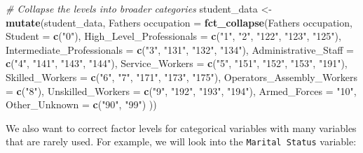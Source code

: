 \documentclass[
]{article}
\newenvironment{Shaded}{\begin{snugshade}}{\end{snugshade}}
\newcommand{\AttributeTok}[1]{\textcolor[rgb]{0.13,0.29,0.53}{#1}}
\newcommand{\CommentTok}[1]{\textcolor[rgb]{0.56,0.35,0.01}{\textit{#1}}}
\newcommand{\FunctionTok}[1]{\textcolor[rgb]{0.13,0.29,0.53}{\textbf{#1}}}
\newcommand{\NormalTok}[1]{#1}
\newcommand{\OtherTok}[1]{\textcolor[rgb]{0.56,0.35,0.01}{#1}}
\newcommand{\SpecialCharTok}[1]{\textcolor[rgb]{0.81,0.36,0.00}{\textbf{#1}}}
\newcommand{\StringTok}[1]{\textcolor[rgb]{0.31,0.60,0.02}{#1}}
\begin{document}
\begin{Shaded}
\begin{Highlighting}[]
\CommentTok{\# Collapse the levels into broader categories}
\NormalTok{student\_data }\OtherTok{\textless{}{-}} \FunctionTok{mutate}\NormalTok{(student\_data, }\StringTok{\textasciigrave{}}\AttributeTok{Father\textquotesingle{}s occupation}\StringTok{\textasciigrave{}} \OtherTok{=} \FunctionTok{fct\_collapse}\NormalTok{(}\StringTok{\textasciigrave{}}\AttributeTok{Father\textquotesingle{}s occupation}\StringTok{\textasciigrave{}}\NormalTok{,}
    \AttributeTok{Student =} \FunctionTok{c}\NormalTok{(}\StringTok{"0"}\NormalTok{),}
    \AttributeTok{High\_Level\_Professionals =} \FunctionTok{c}\NormalTok{(}\StringTok{"1"}\NormalTok{, }\StringTok{"2"}\NormalTok{, }\StringTok{"122"}\NormalTok{, }\StringTok{"123"}\NormalTok{, }\StringTok{"125"}\NormalTok{),}
    \AttributeTok{Intermediate\_Professionals =} \FunctionTok{c}\NormalTok{(}\StringTok{"3"}\NormalTok{, }\StringTok{"131"}\NormalTok{, }\StringTok{"132"}\NormalTok{, }\StringTok{"134"}\NormalTok{),}
    \AttributeTok{Administrative\_Staff =} \FunctionTok{c}\NormalTok{(}\StringTok{"4"}\NormalTok{, }\StringTok{"141"}\NormalTok{, }\StringTok{"143"}\NormalTok{, }\StringTok{"144"}\NormalTok{),}
    \AttributeTok{Service\_Workers =} \FunctionTok{c}\NormalTok{(}\StringTok{"5"}\NormalTok{, }\StringTok{"151"}\NormalTok{, }\StringTok{"152"}\NormalTok{, }\StringTok{"153"}\NormalTok{, }\StringTok{"191"}\NormalTok{),}
    \AttributeTok{Skilled\_Workers =} \FunctionTok{c}\NormalTok{(}\StringTok{"6"}\NormalTok{, }\StringTok{"7"}\NormalTok{, }\StringTok{"171"}\NormalTok{, }\StringTok{"173"}\NormalTok{, }\StringTok{"175"}\NormalTok{),}
    \AttributeTok{Operators\_Assembly\_Workers =} \FunctionTok{c}\NormalTok{(}\StringTok{"8"}\NormalTok{),}
    \AttributeTok{Unskilled\_Workers =} \FunctionTok{c}\NormalTok{(}\StringTok{"9"}\NormalTok{, }\StringTok{"192"}\NormalTok{, }\StringTok{"193"}\NormalTok{, }\StringTok{"194"}\NormalTok{),}
    \AttributeTok{Armed\_Forces =} \StringTok{"10"}\NormalTok{,}
    \AttributeTok{Other\_Unknown =} \FunctionTok{c}\NormalTok{(}\StringTok{"90"}\NormalTok{, }\StringTok{"99"}\NormalTok{)}
\NormalTok{))}
\end{Highlighting}
\end{Shaded}

We also want to correct factor levels for categorical variables with
many variables that are rarely used. For example, we will look into the
\texttt{Marital\ Status} variable:

\begin{Shaded}
\end{Shaded}
\end{document}
